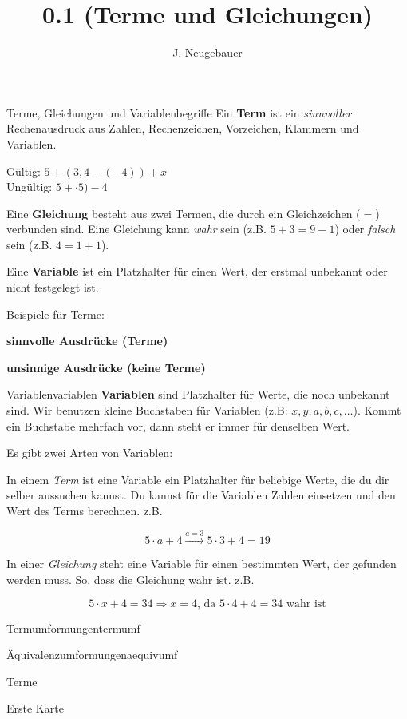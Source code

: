 \documentclass[12pt,a5paper,landscape]{scrartcl}
\author{J. Neugebauer}
\title{0.1 (Terme und Gleichungen)}
\date{\Heute}
\begin{document}
\begin{hilfekarte}{Terme, Gleichungen und Variablen}{begriffe}
	Ein \textbf{Term} ist ein \emph{sinnvoller} Rechenausdruck aus Zahlen, Rechenzeichen, Vorzeichen, Klammern und Variablen.
	
	Gültig: $5+(3,4 - (-4)) + x$\\
	Ungültig: $5+\cdot5)-4$
	
	\vspace{1cm}
	Eine \textbf{Gleichung} besteht aus zwei Termen, die durch ein Gleichzeichen ($=$) verbunden sind. Eine Gleichung kann \emph{wahr} sein (z.B. $5+3 = 9-1$) oder \emph{falsch} sein (z.B. $4 = 1+1$).
	
	\vspace{1cm}
	Eine \textbf{Variable} ist ein Platzhalter für einen Wert, der erstmal unbekannt oder nicht festgelegt ist.
\end{hilfekarte}

\begin{loesungskarte}
	Beispiele für Terme:
	\begin{multicols}{2}
		\textbf{sinnvolle Ausdrücke (Terme)}
		
		\textbf{unsinnige Ausdrücke (keine Terme)}
	\end{multicols}
\end{loesungskarte}


\begin{hilfekarte}{Variablen}{variablen}
	\textbf{Variablen} sind Platzhalter für Werte, die noch unbekannt sind. Wir benutzen kleine Buchstaben für Variablen (z.B: $x,y,a,b,c,\dots$). Kommt ein Buchstabe mehrfach vor, dann steht er immer für denselben Wert.
	
	Es gibt zwei Arten von Variablen:
	
	In einem \emph{Term} ist eine Variable ein Platzhalter für beliebige Werte, die du dir selber aussuchen kannst. Du kannst für die Variablen Zahlen einsetzen und den Wert des Terms berechnen. z.B.
	
	\[ 5\cdot a + 4 \overset{a = 3}{\longrightarrow} 5\cdot 3 + 4 = 19 \]
	
	In einer \emph{Gleichung} steht eine Variable für einen bestimmten Wert, der gefunden werden muss. So, dass die Gleichung wahr ist. z.B.
	
	\[ 5\cdot x + 4 = 34 \Rightarrow x = 4 \text{, da } 5\cdot 4 + 4 = 34\text{ wahr ist} \]
\end{hilfekarte}

\leereKarte

\begin{hilfekarte}{Termumformungen}{termumf}
\end{hilfekarte}

\leereKarte

\begin{hilfekarte}{Äquivalenzumformungen}{aequivumf}
\end{hilfekarte}

\leereKarte

\begin{karte1}{Terme }
	
\end{karte1}

\begin{loesungskarte}{Erste Karte}

\end{loesungskarte}
\end{document}
